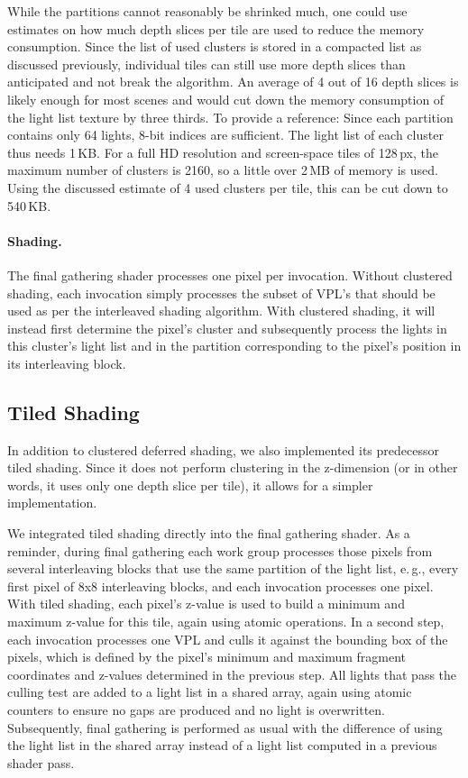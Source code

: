 While the partitions cannot reasonably be shrinked much, one could use estimates on how much depth slices per tile are used to reduce the memory consumption. Since the list of used clusters is stored in a compacted list as discussed previously, individual tiles can still use more depth slices than anticipated and not break the algorithm. An average of 4 out of 16 depth slices is likely enough for most scenes and would cut down the memory consumption of the light list texture by three thirds. To provide a reference: Since each partition contains only 64 lights, 8-bit indices are sufficient. The light list of each cluster thus needs 1\,KB. For a full HD resolution and screen-space tiles of 128\,px, the maximum number of clusters is 2160, so a little over 2\,MB of memory is used. Using the discussed estimate of 4 used clusters per tile, this can be cut down to 540\,KB.

\paragraph{Shading.}
The final gathering shader processes one pixel per invocation. Without clustered shading, each invocation simply processes the subset of VPL's that should be used as per the interleaved shading algorithm. With clustered shading, it will instead first determine the pixel's cluster and subsequently process the lights in this cluster's light list and in the partition corresponding to the pixel's position in its interleaving block.


\subsection{Tiled Shading}

In addition to clustered deferred shading, we also implemented its predecessor tiled shading. Since it does not perform clustering in the z-dimension (or in other words, it uses only one depth slice per tile), it allows for a simpler implementation.

We integrated tiled shading directly into the final gathering shader. As a reminder, during final gathering each work group processes those pixels from several interleaving blocks that use the same partition of the light list, e.\,g., every first pixel of 8x8 interleaving blocks, and each invocation processes one pixel. With tiled shading, each pixel's z-value is used to build a minimum and maximum z-value for this tile, again using atomic operations. In a second step, each invocation processes one VPL and culls it against the bounding box of the pixels, which is defined by the pixel's minimum and maximum fragment coordinates and z-values determined in the previous step. All lights that pass the culling test are added to a light list in a shared array, again using atomic counters to ensure no gaps are produced and no light is overwritten. Subsequently, final gathering is performed as usual with the difference of using the light list in the shared array instead of a light list computed in a previous shader pass.

